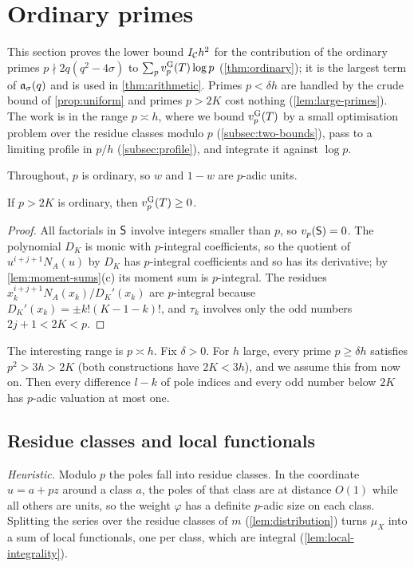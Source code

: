 \section{Ordinary primes}\label{sec:ordinary}

This section proves the lower bound $I_{\mathcal C}h^2$ for the contribution of the
ordinary primes $p\nmid2q(q^2-4\sigma)$ to $\sum_pv_{p}^{\mathrm{G}}(T)\log p$ (\cref{thm:ordinary}); it is the
largest term of $\mathfrak{a}_\sigma(q)$ and is used in \cref{thm:arithmetic}. Primes $p<\delta h$ are
handled by the crude bound of \cref{prop:uniform} and primes $p>2K$ cost nothing
(\cref{lem:large-primes}). The work is in the range $p\asymp h$, where we bound $v_{p}^{\mathrm{G}}(T)$ by a
small optimisation problem over the residue classes modulo $p$ (\cref{subsec:two-bounds}), pass to
a limiting profile in $p/h$ (\cref{subsec:profile}), and integrate it against $\log p$.

Throughout, $p$ is ordinary, so $w$ and $1-w$ are $p$-adic units.

\begin{lemma}\label{lem:large-primes}
If $p>2K$ is ordinary, then $v_{p}^{\mathrm{G}}(T)\ge0$.
\end{lemma}

\begin{proof}
All factorials in $\mathsf{S}$ involve integers smaller than $p$, so $v_p(\mathsf{S})=0$. The polynomial
$D_K$ is monic with $p$-integral coefficients, so the quotient of $u^{i+j+1}N_A(u)$ by $D_K$ has
$p$-integral coefficients and so has its derivative; by \cref{lem:moment-sums}(c) its moment sum
is $p$-integral. The residues $x_k^{i+j+1}N_A(x_k)/D_K'(x_k)$ are $p$-integral because
$D_K'(x_k)=\pm k!(K-1-k)!$, and $\tau_k$ involves only the odd numbers $2j+1<2K<p$.
\end{proof}

The interesting range is $p\asymp h$. Fix $\delta>0$. For $h$ large, every prime
$p\ge\delta h$ satisfies $p^2>3h>2K$ (both constructions have $2K<3h$), and we assume this from
now on. Then every difference
$l-k$ of pole indices and every odd number below $2K$ has $p$-adic valuation at most one.

\subsection{Residue classes and local functionals}\label{subsec:distribution}

\emph{Heuristic.} Modulo $p$ the poles fall into residue classes. In the coordinate $u=a+pz$
around a class $a$, the poles of that class are at distance $O(1)$ while all others are units,
so the weight $\varphi$ has a definite $p$-adic size on each class. Splitting the series over
the residue classes of $m$ (\cref{lem:distribution}) turns $\mu_X$ into a sum of local
functionals, one per class, which are integral (\cref{lem:local-integrality}).


